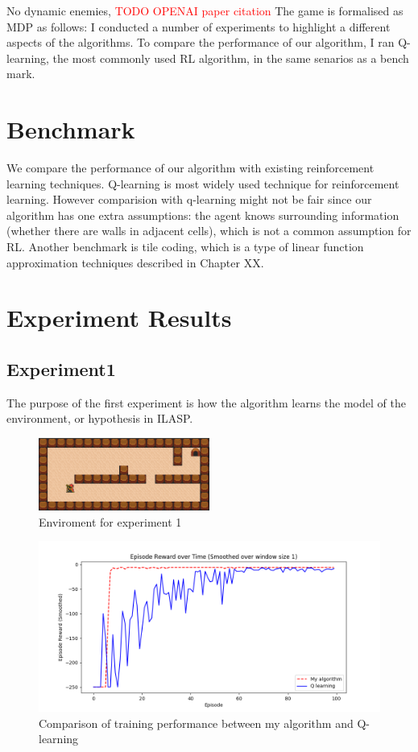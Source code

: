 No dynamic enemies,
\textcolor{red}{TODO OPENAI paper citation}
The game is formalised as MDP as follows:
I conducted a number of experiments to highlight a different aspects of the algorithms. 
To compare the performance of our algorithm, I ran Q-learning, the most commonly used RL algorithm, in the same senarios as a bench mark. 

\section{Benchmark}

We compare the performance of our algorithm with existing reinforcement learning techniques. 
Q-learning is most widely used technique for reinforcement learning. However comparision with q-learning might not be fair 
since our algorithm has one extra assumptions: the agent knows surrounding information (whether there are walls in adjacent cells), 
which is not a common assumption for RL.
Another benchmark is tile coding, which is a type of linear function approximation techniques described in Chapter XX. 

\section{Experiment Results}
\label{learning_evaluation}

\subsection{Experiment1}
The purpose of the first experiment is how the algorithm learns the model of the environment, or hypothesis in ILASP.

\begin{figure}[!htb]
\centering
\includegraphics[width=0.5\textwidth]{./figures/experiment1}
\caption{Enviroment for experiment 1}
\label{experiment1}
\end{figure}
    

\begin{figure}[!htb]
\centering
\includegraphics[width=1.0\textwidth]{./figures/experiment1_training}
\caption{Comparison of training performance between my algorithm and Q-learning}
\label{experiment1_training}
\end{figure}


